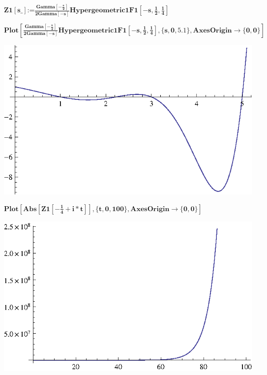 \documentclass{article}
\begin{document}
\noindent\(\pmb{\text{Z1}[\text{s$\_$}]\text{:=}\frac{\text{Gamma}\left[-\frac{s}{2}\right]}{2\text{Gamma}[-s]}\text{Hypergeometric1F1}\left[-s,\frac{1}{2},\frac{1}{4}\right]}\)

\noindent\(\pmb{\text{Plot}\left[\frac{\text{Gamma}\left[-\frac{s}{2}\right]}{2\text{Gamma}[-s]}\text{Hypergeometric1F1}\left[-s,\frac{1}{2},\frac{1}{4}\right],\{s,0,5.1\},\text{AxesOrigin}\to
\{0,0\}\right]}\)

\includegraphics{PlotsRiemannH_gr1.eps}

\noindent\(\pmb{\text{Plot}\left[\text{Abs}\left[\text{Z1}\left[-\frac{1}{4}+i*t\right]\right],\{t,0,100\},\text{AxesOrigin}\to \{0,0\}\right]}\)

\includegraphics{PlotsRiemannH_gr2.eps}
\end{document}

